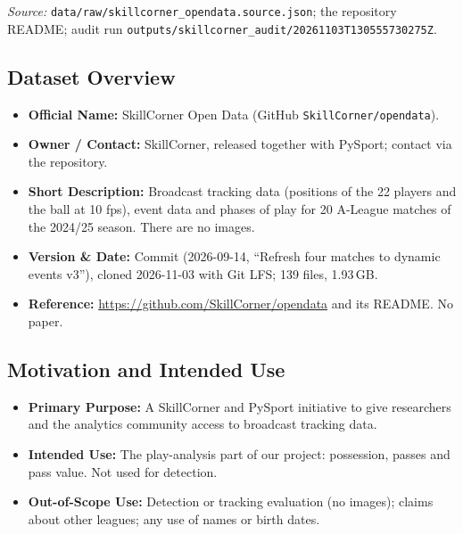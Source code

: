 \documentclass[11pt, a4paper]{article}
\begin{document}
\begin{sloppypar}\noindent\textit{Source:} \texttt{data/raw/}\allowbreak\texttt{skillcorner\_opendata.source.json}; the repository README; audit run \texttt{outputs/}\allowbreak\texttt{skillcorner\_audit/}\allowbreak\texttt{20261103T130555730275Z}.\end{sloppypar}

\subsection{Dataset Overview}
\begin{itemize}
    \item \textbf{Official Name:} SkillCorner Open Data (GitHub \texttt{SkillCorner/opendata}).
    \item \textbf{Owner / Contact:} SkillCorner, released together with PySport; contact via the repository.
    \item \textbf{Short Description:} Broadcast tracking data (positions of the 22 players and the ball at 10 fps), event data and phases of play for 20 A-League matches of the 2024/25 season. There are no images.
    \item \textbf{Version \& Date:} Commit  (2026-09-14, ``Refresh four matches to dynamic events v3''), cloned 2026-11-03 with Git LFS; 139 files, 1.93\,GB.
    \item \textbf{Reference:} \url{https://github.com/SkillCorner/opendata} and its README. No paper.
\end{itemize}

\subsection{Motivation and Intended Use}
\begin{itemize}
    \item \textbf{Primary Purpose:} A SkillCorner and PySport initiative to give researchers and the analytics community access to broadcast tracking data.
    \item \textbf{Intended Use:} The play-analysis part of our project: possession, passes and pass value. Not used for detection.
    \item \textbf{Out-of-Scope Use:} Detection or tracking evaluation (no images); claims about other leagues; any use of names or birth dates.
\end{itemize}
\end{document}
